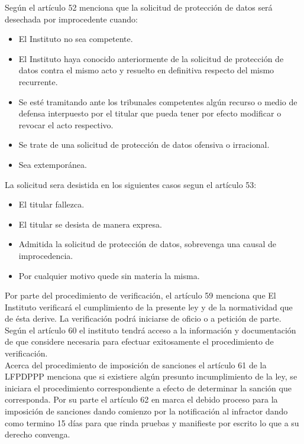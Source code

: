 \documentclass[runningheads,a4paper]{llncs}
\begin{document}
Según \cite{LFPDPPP_1} el artículo 52 menciona que la solicitud de protección de datos será desechada por improcedente cuando:

\begin{itemize}
	\item El Instituto no sea competente.
	\item El Instituto haya conocido anteriormente de la solicitud de protección de datos contra el mismo
acto y resuelto en definitiva respecto del mismo recurrente.
	\item Se esté tramitando ante los tribunales competentes algún recurso o medio de defensa
interpuesto por el titular que pueda tener por efecto modificar o revocar el acto respectivo.
	\item Se trate de una solicitud de protección de datos ofensiva o irracional.
	\item Sea extemporánea.
\end{itemize}

La solicitud sera desistida en los siguientes casos segun el artículo 53:

\begin{itemize}
	\item El titular fallezca.
	\item El titular se desista de manera expresa.
	\item Admitida la solicitud de protección de datos, sobrevenga una causal de improcedencia.
	\item Por cualquier motivo quede sin materia la misma.
\end{itemize}

Por parte del procedimiento de verificación, el artículo 59 menciona que El Instituto verificará el cumplimiento de la presente ley y de la normatividad que de ésta derive. La verificación podrá iniciarse de oficio o a petición de parte. Según el artículo 60 el instituto tendrá acceso a la información y documentación de que considere necesaria para efectuar exitosamente el procedimiento de verificación.\\

Acerca del procedimiento de imposición de sanciones el artículo 61 de la \gls{LFPDPPP} menciona que si existiere algún presunto incumplimiento de la ley, se iniciara el procedimiento correspondiente a efecto de determinar la sanción que corresponda. Por su parte el artículo 62 en \cite{LFPDPPP_1} marca el debido proceso para la imposición de sanciones dando comienzo por la notificación al infractor dando como termino 15 días para que rinda pruebas y manifieste por escrito lo que a su derecho convenga.\\
\end{document}
